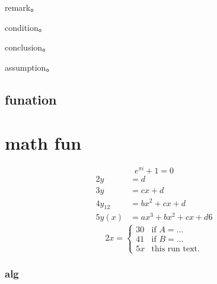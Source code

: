 \documentclass[writingLanguage=english, %
    addPageTitle=on,  %
    addDeclaration=on, %
    addMUSTlog=off, %
    addFigTOC=on, %
    addTabTOC=on, %
    refIndent=off, %
    printMod=off, %
]{must}
\begin{document}
\begin{remark}
 remark。
\end{remark}



\begin{condition}
 condition。
\end{condition}



\begin{conclusion}
 conclusion。
\end{conclusion}


\begin{assumption}
 assumption。
\end{assumption}






\section{funation}









\chapter{math fun}
\begin{equation}
\label{eq1}
e^{\pi i}+1=0
\end{equation}
\begin{align}
2 y & =d\label{eq:IntoSection}\\
3 y & =cx+d\\
4 y_{12} & =bx^{2}+cx+d\\
5 y(x) & =ax^{3}+bx^{2}+cx+d
6 
\end{align}
\begin{equation}
2 x=\left\{ \begin{array}{cl}
3 0 & \textrm{if }A=\ldots\\
4 1 & \textrm{if }B=\ldots\\
5 x & \textrm{this run  text.}\end
{array}\right.
\end{equation}       


\subsection{alg}

 
\end{document}
